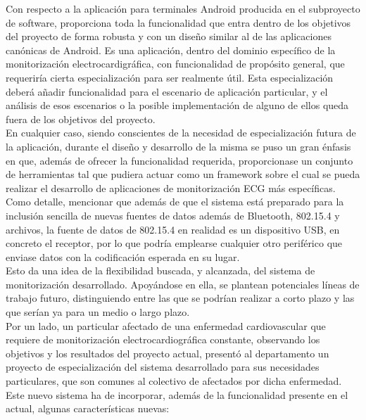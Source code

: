 	Con respecto a la aplicación para terminales Android producida en el subproyecto de software, proporciona toda la funcionalidad que entra dentro de los objetivos del proyecto de forma robusta y con un diseño similar al de las aplicaciones canónicas de Android. Es una aplicación, dentro del dominio específico de la monitorización electrocardigráfica, con funcionalidad de propósito general, que requeriría cierta especialización para ser realmente útil. Esta especialización deberá añadir funcionalidad para el escenario de aplicación particular, y el análisis de esos escenarios o la posible implementación de alguno de ellos queda fuera de los objetivos del proyecto.\\

	En cualquier caso, siendo conscientes de la necesidad de especialización futura de la aplicación, durante el diseño y desarrollo de la misma se puso un gran énfasis en que, además de ofrecer la funcionalidad requerida, proporcionase un conjunto de herramientas tal que pudiera actuar como un framework sobre el cual se pueda realizar el desarrollo de aplicaciones de monitorización ECG más específicas. Como detalle, mencionar que además de que el sistema está preparado para la inclusión sencilla de nuevas fuentes de datos además de Bluetooth, 802.15.4 y archivos, la fuente de datos de 802.15.4 en realidad es un dispositivo USB, en concreto el receptor, por lo que podría emplearse cualquier otro periférico que enviase datos con la codificación esperada en su lugar.\\

	Esto da una idea de la flexibilidad buscada, y alcanzada, del sistema de monitorización desarrollado. Apoyándose en ella, se plantean potenciales líneas de trabajo futuro, distinguiendo entre las que se podrían realizar a corto plazo y las que serían ya para un medio o largo plazo.\\

	Por un lado, un particular afectado de una enfermedad cardiovascular que requiere de monitorización electrocardiográfica constante, observando los objetivos y los resultados del proyecto actual, presentó al departamento un proyecto de especialización del sistema desarrollado para sus necesidades particulares, que son comunes al colectivo de afectados por dicha enfermedad. Este nuevo sistema ha de incorporar, además de la funcionalidad presente en el actual, algunas características nuevas:


